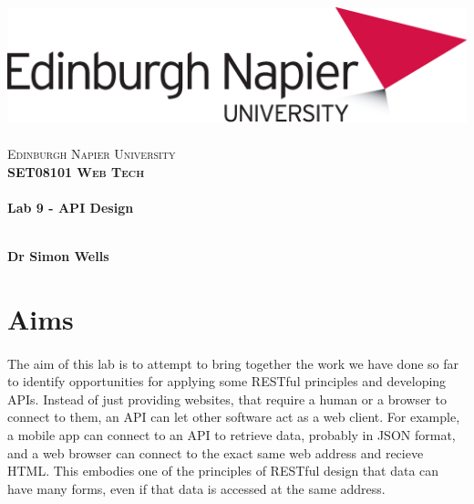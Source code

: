 \documentclass[10pt, a4paper, twosize]{article}
\begin{document}

\begin{titlepage}
\vspace*{5cm}
\begin{center}
\includegraphics[width=.5\textwidth]{images/EdNapUniLogoCMYK}~\\[1cm]

\textsc{\Large Edinburgh Napier University}\\[1.5cm]

\textsc{\LARGE \bfseries SET08101 Web Tech}\\[0.5cm]

\hrulefill \\[0.4cm]
{\huge \bfseries Lab 9 - API Design\\[0.4cm] }
\hrulefill \\[1.5cm]

\begin{minipage}{0.4\textwidth}
\begin{flushleft} \large
\textbf{Dr Simon Wells} \\
\end{flushleft}
\end{minipage}

\vfill

\end{center}
\end{titlepage}




%

\section{Aims}
\paragraph{} The aim of this lab is to attempt to bring together the work we have done so far to identify opportunities for applying some RESTful principles and developing APIs. Instead of just providing websites, that require a human or a browser to connect to them, an API can let other software act as a web client. For example, a mobile app can connect to an API to retrieve data, probably in JSON format, and a web browser can connect to the exact same web address and recieve HTML. This embodies one of the principles of RESTful design that data can have many forms, even if that data is accessed at the same address.
\end{document}
